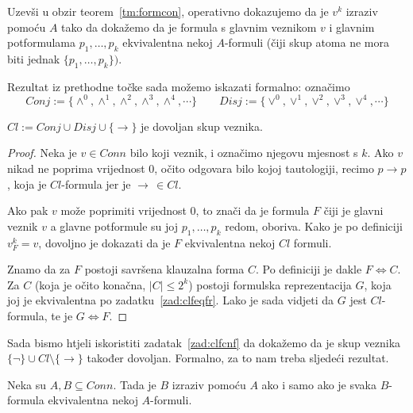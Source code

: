 Uzevši u obzir teorem~\ref{tm:formcon}, operativno dokazujemo da je $v^k$ izraziv pomoću $A$ tako da dokažemo da je formula s glavnim veznikom $v$ i glavnim potformulama $p_1, \ldots, p_k$ ekvivalentna nekoj $A$-formuli (čiji skup atoma ne mora biti jednak $\{p_1,\ldots,p_k\})$.

Rezultat iz prethodne točke sada možemo iskazati formalno: označimo
$$Conj:=\{\wedge^0, \wedge^1, \wedge^2, \wedge^3,\wedge^4,\cdots\}\qquad Disj:=\{\vee^0, \vee^1, \vee^2,\vee^3,\vee^4,\cdots\}$$

\begin{teorem}
$Cl:=Conj\cup Disj\cup\{\to\}$ je
dovoljan skup veznika.
\end{teorem}

\begin{proof}
Neka je $v\in Conn$ bilo koji veznik, i označimo njegovu mjesnost s $k$. Ako $v$ nikad ne poprima vrijednost $0$, očito odgovara bilo kojoj tautologiji, recimo $p\to p$, koja je $Cl$-formula jer je $\to\,\in Cl$.

Ako pak $v$ može poprimiti vrijednost $0$, to znači da je formula $F$ čiji je glavni veznik $v$ a glavne potformule su joj $p_1,\ldots,p_k$ redom, oboriva. Kako je po definiciji $v^k_F=v$, dovoljno je dokazati da je $F$ ekvivalentna nekoj $Cl$ formuli.

Znamo da za $F$ postoji savršena klauzalna forma $C$. Po definiciji je dakle $F\Leftrightarrow C$. Za $C$ (koja je očito konačna, $\left|C\right|\le 2^k$) postoji formulska reprezentacija $G$, koja joj je ekvivalentna po zadatku~\ref{zad:clfeqfr}. Lako je sada vidjeti da $G$ jest $Cl$-formula, te je $G\Leftrightarrow F$.
\end{proof}

Sada bismo htjeli iskoristiti zadatak~\ref{zad:clfcnf} da dokažemo da je skup veznika $\{\neg\}\cup Cl\setminus\{\to\}$ također dovoljan. Formalno, za to nam treba sljedeći rezultat.

\begin{teorem}
	Neka su $A, B\subseteq Conn$. Tada je $B$ izraziv pomoću $A$ ako i samo ako je svaka $B$-formula ekvivalentna nekoj $A$-formuli.
\end{teorem}

